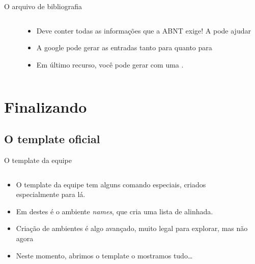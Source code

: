    \begin{frame}{O arquivo de bibliografia}
        \begin{columns}
            \begin{column}{0.5\linewidth}
                
            \end{column}
            \pause
            \begin{column}{0.5\linewidth}
                \justify
                \begin{itemize}[<+->]
                    \item Deve conter todas as informações que a ABNT exige! A \href{http://ftp.inf.utfsm.cl/pub/tex-archive/macros/latex/contrib/abntex2/doc/abntex2cite.pdf}{} pode ajudar
                    \item A google pode gerar as entradas tanto para \href{https://scholar.google.com}{} quanto para \href{https://books.google.com}{}
                    \item Em último recurso, você pode gerar com uma \href{https://truben.no/latex/bibtex/}{}.
                \end{itemize}
            \end{column}
        \end{columns}
    \end{frame}


\section{Finalizando}
    \subsection{O template oficial}
    \begin{frame}{O template da equipe}
        \begin{columns}
            \begin{column}{0.5\linewidth}
                \justify
                \begin{itemize}[<+->]
                    \item O template da equipe tem alguns comando especiais, criados especialmente para lá.
                    \item Em destes é o ambiente \emph{names}, que cria uma lista de alinhada.
                    \item Criação de ambientes é algo avançado, muito legal para explorar, mas não agora
                    \item Neste momento, abrimos o template o mostramos tudo\dots
                \end{itemize}
            \end{column}
            \begin{column}{0.5\linewidth}
            \end{column}
        \end{columns}
    \end{frame}

